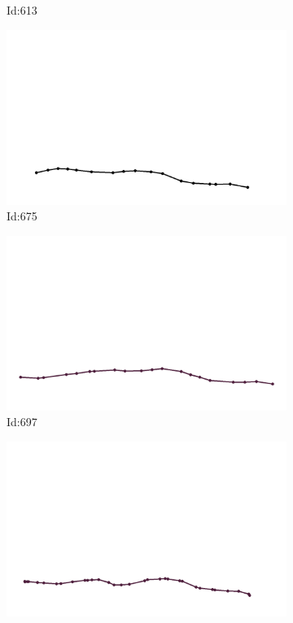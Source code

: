 \documentclass[12pt,twoside]{report}
\begin{document}
\begin{figure}
\begin{subfigure}[b]{0.20\textwidth}
\caption{Id:613}
\end{subfigure}
\begin{subfigure}[b]{0.20\textwidth}
\centering
\includegraphics[width=\textwidth]{../trajectories/675.png}
\caption{Id:675}
\end{subfigure}
\begin{subfigure}[b]{0.20\textwidth}
\centering
\includegraphics[width=\textwidth]{../trajectories/697.png}
\caption{Id:697}
\end{subfigure}
\begin{subfigure}[b]{0.20\textwidth}
\centering
\includegraphics[width=\textwidth]{../trajectories/739.png}

\end{subfigure}
\end{figure}
\end{document}
